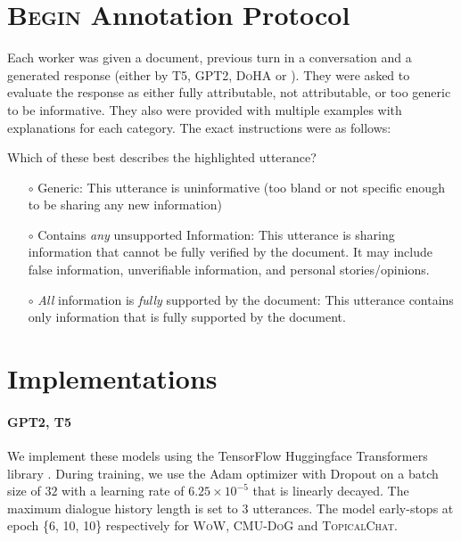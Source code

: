 \appendix

{

}




\section{\textsc{Begin} Annotation Protocol} 
\label{sec:annotationprotocol}
Each worker was given a document, previous turn in a conversation and a generated response (either by \textsc{T5}, \textsc{GPT2}, \textsc{DoHA} or \CTRL{}).  They were asked to evaluate the response as either fully attributable, not attributable, or too generic to be informative. They also were provided with multiple examples with explanations for each category. The exact instructions were as follows:
\begin{mdframed}[leftmargin=0pt,rightmargin=0pt]
\small
Which of these best describes the highlighted utterance?
\begin{itemize}
    \item[$\circ$] {Generic: This utterance is uninformative (too bland or not specific enough to be sharing any new information) }
    \item[$\circ$] {Contains \emph{any} unsupported Information:
This utterance is sharing information that cannot be fully verified by the document.  It may include  false information, unverifiable information, and personal stories/opinions.}
    \item[$\circ$] {\emph{All} information is \emph{fully} supported by the document: This utterance contains only information that is fully supported by the document.}
\end{itemize}
\end{mdframed}



\section{Implementations}
\label{sec:hyperparam}

\paragraph{GPT2, T5} We implement these models using the TensorFlow Huggingface Transformers library \cite{wolf-etal-2020-transformers}. During training, we use the Adam optimizer \cite{DBLP:journals/corr/KingmaB14} with Dropout \cite{srivastava2014dropout} on a batch size of $32$ with a learning rate of $6.25 \times 10^{-5}$ that is linearly decayed. The maximum dialogue history length is set to $3$ utterances. The model early-stops at epoch \{6, 10, 10\} respectively for \textsc{WoW}, \textsc{CMU-DoG} and \textsc{TopicalChat}.

